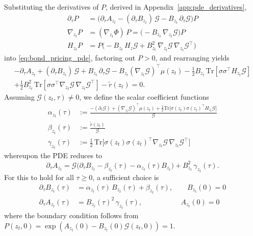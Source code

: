 Substituting the derivatives of $P$, derived in Appendix~\ref{app:pde_derivatives},
\begin{align}
    \partial_\tau P
&=
\Big(
\partial_\tau A_{z_t}
-
(\partial_\tau B_{z_t})\,\mathcal{G}
-
B_{z_t}\,\partial_\tau \mathcal{G}
\Big)P\\
\nabla_{z_t} P
&=
(\nabla_{z_t} \Phi)\,P=
\big(-B_{z_t}\,\nabla_{z_t} \mathcal{G}\big)P\\
H_{z_t} P&=
P\Big(
-B_{z_t}\,H_z \mathcal{G}
+
B_{z_t}^2\,\nabla_{z_t} \mathcal{G}\,\nabla_{z_t} \mathcal{G}^\top
\Big)
\end{align}
into \eqref{eq:bond_pricing_pde}, factoring out $P>0$, and rearranging yields
\begin{equation*}
\begin{split}
-\partial_\tau A_{z_t} + (\partial_\tau B_{z_t})\,\mathcal{G} + B_{z_t}\,\partial_\tau\mathcal{G} 
- B_{z_t}(\nabla_{z_t}\mathcal{G})^\top\mu(z_t) 
- \tfrac{1}{2}B_{z_t}\,\mathrm{Tr}\!\left[\sigma\sigma^\top H_{z_t}\mathcal{G}\right] \\
+ \tfrac{1}{2}B_{z_t}^2\,\mathrm{Tr}\!\left[\sigma\sigma^\top\nabla_{z_t}\mathcal{G}\,\nabla_{z_t}\mathcal{G}^\top\right] 
- \tilde{r}(z_t) = 0.
\end{split}
\end{equation*}
Assuming \(\mathcal{G}(z_t,\tau)\neq 0\), we define the scalar coefficient functions
\begin{align}
\alpha_{z_t}(\tau)&:=\frac{-(\partial_\tau \mathcal{G})+(\nabla_{z_t} \mathcal{G})^\top \mu({z_t})+\tfrac12 \mathrm{Tr} \big[\sigma({z_t})\sigma({z_t})^\top H_{z_t} \mathcal{G}\big]
}{\mathcal{G}}\\
\beta_{z_t}(\tau)&:=\frac{\tilde r(z_t)}{\mathcal{G}}\\
\gamma_{z_t}(\tau)&:=
\frac12\,\mathrm{Tr} \Big[\sigma({z_t})\sigma({z_t})^\top \nabla_{z_t} \mathcal{G}\,\nabla_{z_t} \mathcal{G}^\top\Big]
\end{align}
whereupon the PDE reduces to
\[
\partial_\tau A_{z_t} = \mathcal{G}\big(\partial_\tau B_{z_t} - \beta_{z_t}(\tau) - \alpha_{z_t}(\tau) B_{z_t}\big) + B_{z_t}^2\,\gamma_{z_t}(\tau).
\]
For this to hold for all $\tau\geq0$, a sufficient choice is
\begin{align}
\partial_\tau B_{z_t}(\tau) &= \alpha_{z_t}(\tau)\,B_{z_t}(\tau) + \beta_{z_t}(\tau),\qquad B_{z_t}(0)=0
\label{ODEB}\\
\partial_\tau A_{z_t}(\tau) &= B_{z_t}(\tau)^2\,\gamma_{z_t}(\tau),\qquad \qquad\;\;\;\;\; A_{z_t}(0)=0
\label{ODEA}
\end{align}
where the boundary condition follows from $P(z_t,0)=\exp(A_{z_t}(0)-B_{z_t}(0)\mathcal{G}(z_t,0))=1$.

